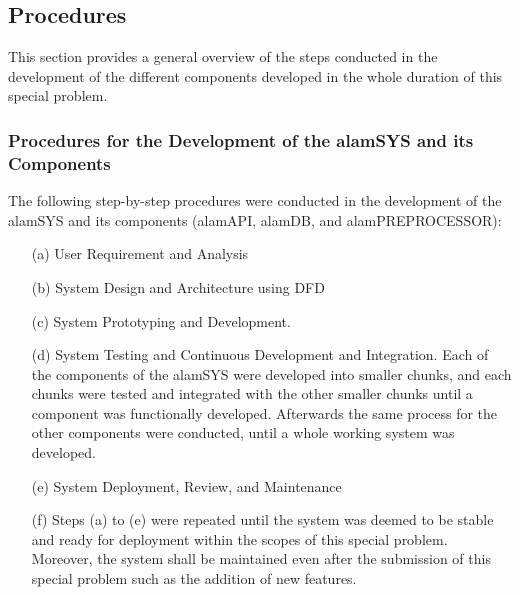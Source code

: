 \subsection{Procedures}
\label{subsec:procedures}
This section provides a general overview of the steps conducted
in the development of the different components developed in the
whole duration of this special problem.

\subsubsection{Procedures for the Development of the alamSYS and its Components}
\label{subsubsec:proc_alamSYS}
The following step-by-step procedures were conducted in the development
of the alamSYS and its components (alamAPI, alamDB, and alamPREPROCESSOR):
\begin{itemize}
    \item[(a)] User Requirement and Analysis
    \item[(b)] System Design and Architecture using DFD
    \item[(c)] System Prototyping and Development.
    \item[(d)] System Testing and Continuous Development and Integration.
    Each of the components of the alamSYS were developed into smaller chunks,
    and each chunks were tested and integrated with the other smaller chunks
    until a component was functionally developed. Afterwards the same process for
    the other components were conducted, until a whole working system was developed.
    \item[(e)] System Deployment, Review, and Maintenance
    \item[(f)] Steps (a) to (e) were repeated until the system was deemed
    to be stable and ready for deployment within the scopes of this special
    problem. Moreover, the system shall be maintained even after the submission
    of this special problem such as the addition of new features.
\end{itemize}
\hfill \\


